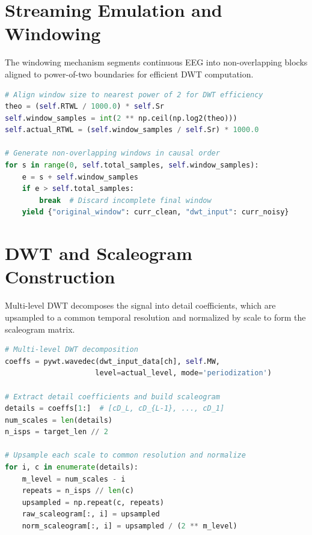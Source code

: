 \documentclass[MScCS,12pt,oneside,final]{uccthesis}
\begin{document}
\section{Streaming Emulation and Windowing}
\label{app:code_streaming}

The windowing mechanism segments continuous EEG into non-overlapping blocks aligned to power-of-two boundaries for efficient DWT computation.

\begin{lstlisting}[language=Python, caption={Core windowing logic}, label={lst:streaming}]
# Align window size to nearest power of 2 for DWT efficiency
theo = (self.RTWL / 1000.0) * self.Sr
self.window_samples = int(2 ** np.ceil(np.log2(theo)))
self.actual_RTWL = (self.window_samples / self.Sr) * 1000.0

# Generate non-overlapping windows in causal order
for s in range(0, self.total_samples, self.window_samples):
    e = s + self.window_samples
    if e > self.total_samples:
        break  # Discard incomplete final window
    yield {"original_window": curr_clean, "dwt_input": curr_noisy}
\end{lstlisting}

\section{DWT and Scaleogram Construction}
\label{app:code_dwt}

Multi-level DWT decomposes the signal into detail coefficients, which are upsampled to a common temporal resolution and normalized by scale to form the scaleogram matrix.

\begin{lstlisting}[language=Python, caption={Scaleogram construction from DWT coefficients}, label={lst:dwt}]
# Multi-level DWT decomposition
coeffs = pywt.wavedec(dwt_input_data[ch], self.MW, 
                     level=actual_level, mode='periodization')

# Extract detail coefficients and build scaleogram
details = coeffs[1:]  # [cD_L, cD_{L-1}, ..., cD_1]
num_scales = len(details)
n_isps = target_len // 2

# Upsample each scale to common resolution and normalize
for i, c in enumerate(details):
    m_level = num_scales - i
    repeats = n_isps // len(c)
    upsampled = np.repeat(c, repeats)
    raw_scaleogram[:, i] = upsampled
    norm_scaleogram[:, i] = upsampled / (2 ** m_level)
\end{lstlisting}
\end{document}
